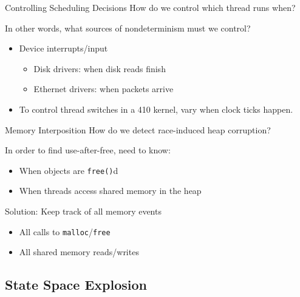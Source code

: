 \documentclass[xcolor=dvipsnames]{beamer}
\begin{document}
\begin{frame}{Controlling Scheduling Decisions}
	How do we control which thread runs when?
	\linegap

	In other words, what sources of nondeterminism must we control?

	\begin{itemize}
		\item Device interrupts/input
			\begin{itemize}
				\item Disk drivers: when disk reads finish
				\item Ethernet drivers: when packets arrive
			\end{itemize}
		\item To control thread switches in a 410 kernel, vary when clock ticks happen.
	\end{itemize}
\end{frame}

\begin{frame}{Memory Interposition}
	How do we detect race-induced heap corruption?
	\linegap

	In order to find use-after-free, need to know:
	\begin{itemize}
		\item When objects are \texttt{free()}d
		\item When threads access shared memory in the heap
	\end{itemize}
	\linegap

	Solution: Keep track of all memory events
	\begin{itemize}
		\item All calls to \texttt{malloc}/\texttt{free}
		\item All shared memory reads/writes
	\end{itemize}
\end{frame}


\subsection{State Space Explosion}
\end{document}
